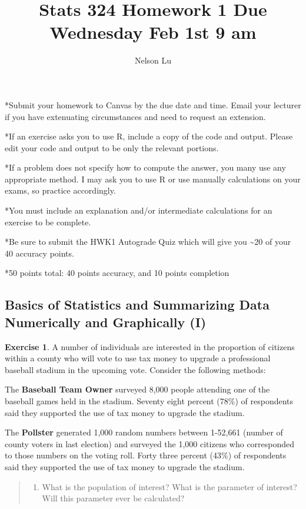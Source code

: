 \documentclass[
]{article}
\title{Stats 324 Homework 1 Due Wednesday Feb 1st 9 am}
\author{Nelson Lu}
\date{}
\providecommand{\tightlist}{%
  \setlength{\itemsep}{0pt}\setlength{\parskip}{0pt}}
\begin{document}
\maketitle

*Submit your homework to Canvas by the due date and time. Email your
lecturer if you have extenuating circumstances and need to request an
extension.

*If an exercise asks you to use R, include a copy of the code and
output. Please edit your code and output to be only the relevant
portions.

*If a problem does not specify how to compute the answer, you many use
any appropriate method. I may ask you to use R or use manually
calculations on your exams, so practice accordingly.

*You must include an explanation and/or intermediate calculations for an
exercise to be complete.

*Be sure to submit the HWK1 Autograde Quiz which will give you
\textasciitilde20 of your 40 accuracy points.

*50 points total: 40 points accuracy, and 10 points completion

\hypertarget{basics-of-statistics-and-summarizing-data-numerically-and-graphically-i}{%
\subsection{Basics of Statistics and Summarizing Data Numerically and
Graphically
(I)}\label{basics-of-statistics-and-summarizing-data-numerically-and-graphically-i}}

\textbf{Exercise 1}. A number of individuals are interested in the
proportion of citizens within a county who will vote to use tax money to
upgrade a professional baseball stadium in the upcoming vote. Consider
the following methods:

The \textbf{Baseball Team Owner} surveyed 8,000 people attending one of
the baseball games held in the stadium. Seventy eight percent (78\%) of
respondents said they supported the use of tax money to upgrade the
stadium.

The \textbf{Pollster} generated 1,000 random numbers between 1-52,661
(number of county voters in last election) and surveyed the 1,000
citizens who corresponded to those numbers on the voting roll. Forty
three percent (43\%) of respondents said they supported the use of tax
money to upgrade the stadium.

\begin{quote}
\begin{enumerate}
\def\labelenumi{\alph{enumi}.}
\tightlist
\item
  What is the population of interest? What is the parameter of interest?
  Will this parameter ever be calculated?
\end{enumerate}
\end{quote}
\end{document}
